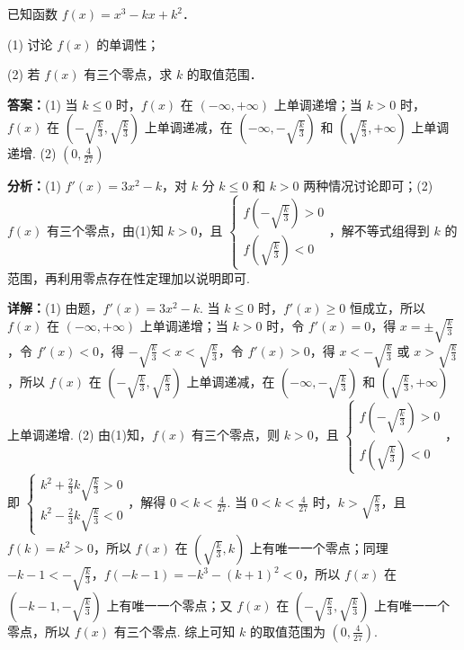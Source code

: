 \begin{question}[points=12]
已知函数 $f(x)=x^3-kx+k^2$．

(1) 讨论 $f(x)$ 的单调性；

(2) 若 $f(x)$ 有三个零点，求 $k$ 的取值范围．
\begin{solution}
\textbf{答案：}(1) 当 $k\leq0$ 时，$f(x)$ 在 $(-\infty,+\infty)$ 上单调递增；当 $k>0$ 时，$f(x)$ 在 $(-\sqrt{\frac{k}{3}},\sqrt{\frac{k}{3}})$ 上单调递减，在 $(-\infty,-\sqrt{\frac{k}{3}})$ 和 $(\sqrt{\frac{k}{3}},+\infty)$ 上单调递增. (2) $(0,\frac{4}{27})$

\textbf{分析：}(1) $f'(x)=3x^2-k$，对 $k$ 分 $k\leq0$ 和 $k>0$ 两种情况讨论即可；(2) $f(x)$ 有三个零点，由(1)知 $k>0$，且 $\begin{cases} f(-\sqrt{\frac{k}{3}})>0 \\ f(\sqrt{\frac{k}{3}})<0 \end{cases}$，解不等式组得到 $k$ 的范围，再利用零点存在性定理加以说明即可.

\textbf{详解：}(1) 由题，$f'(x)=3x^2-k$. 当 $k\leq0$ 时，$f'(x)\geq0$ 恒成立，所以 $f(x)$ 在 $(-\infty,+\infty)$ 上单调递增；当 $k>0$ 时，令 $f'(x)=0$，得 $x=\pm\sqrt{\frac{k}{3}}$，令 $f'(x)<0$，得 $-\sqrt{\frac{k}{3}}<x<\sqrt{\frac{k}{3}}$，令 $f'(x)>0$，得 $x<-\sqrt{\frac{k}{3}}$ 或 $x>\sqrt{\frac{k}{3}}$，所以 $f(x)$ 在 $(-\sqrt{\frac{k}{3}},\sqrt{\frac{k}{3}})$ 上单调递减，在 $(-\infty,-\sqrt{\frac{k}{3}})$ 和 $(\sqrt{\frac{k}{3}},+\infty)$ 上单调递增.
(2) 由(1)知，$f(x)$ 有三个零点，则 $k>0$，且 $\begin{cases} f(-\sqrt{\frac{k}{3}})>0 \\ f(\sqrt{\frac{k}{3}})<0 \end{cases}$，即 $\begin{cases} k^2+\frac{2}{3}k\sqrt{\frac{k}{3}}>0 \\ k^2-\frac{2}{3}k\sqrt{\frac{k}{3}}<0 \end{cases}$，解得 $0<k<\frac{4}{27}$. 当 $0<k<\frac{4}{27}$ 时，$k>\sqrt{\frac{k}{3}}$，且 $f(k)=k^2>0$，所以 $f(x)$ 在 $(\sqrt{\frac{k}{3}},k)$ 上有唯一一个零点；同理 $-k-1<-\sqrt{\frac{k}{3}}$，$f(-k-1)=-k^3-(k+1)^2<0$，所以 $f(x)$ 在 $(-k-1,-\sqrt{\frac{k}{3}})$ 上有唯一一个零点；又 $f(x)$ 在 $(-\sqrt{\frac{k}{3}},\sqrt{\frac{k}{3}})$ 上有唯一一个零点，所以 $f(x)$ 有三个零点. 综上可知 $k$ 的取值范围为 $(0,\frac{4}{27})$.
\end{solution}
\end{question}

